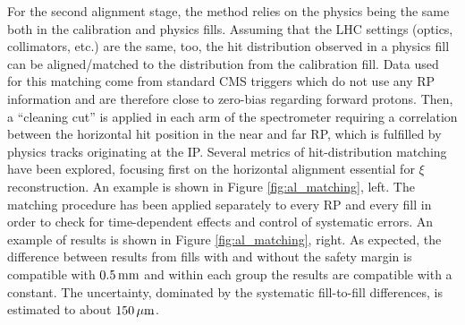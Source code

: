 \documentclass{article}
\def\un#1{\,{\rm #1}}
\begin{document}
For the second alignment stage, the method relies on the physics being the same both in the calibration and physics fills. Assuming that the LHC settings (optics, collimators, etc.) are the same, too, the hit distribution observed in a physics fill can be aligned/matched to the distribution from the calibration fill. Data used for this matching come from standard CMS triggers which do not use any RP information and are therefore close to zero-bias regarding forward protons. Then, a ``cleaning cut'' is applied in each arm of the spectrometer requiring a correlation between the horizontal hit position in the near and far RP, which is fulfilled by physics tracks originating at the IP. Several metrics of hit-distribution matching have been explored, focusing first on the horizontal alignment essential for $\xi$ reconstruction. An example is shown in Figure \ref{fig:al_matching}, left. The matching procedure has been applied separately to every RP and every fill in order to check for time-dependent effects and control of systematic errors. An example of results is shown in Figure \ref{fig:al_matching}, right. As expected, the difference between results from fills with and without the safety margin is compatible with $0.5\un{mm}$ and within each group the results are compatible with a constant. The uncertainty, dominated by the systematic fill-to-fill differences, is estimated to about $150\un{\mu m}$.
\end{document}
